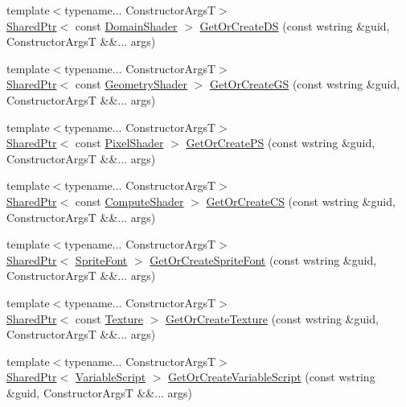 \begin{DoxyCompactItemize}
\item 
{\footnotesize template$<$typename... Constructor\+ArgsT$>$ }\\\hyperlink{namespacemage_a1e01ae66713838a7a67d30e44c67703e}{Shared\+Ptr}$<$ const \hyperlink{namespacemage_aef8cda73e2387cb89baa6c54a7fea542}{Domain\+Shader} $>$ \hyperlink{classmage_1_1_resource_manager_a77fd5f64a5191df468ccfaabd197d60b}{Get\+Or\+Create\+DS} (const wstring \&guid, Constructor\+ArgsT \&\&... args)
\item 
{\footnotesize template$<$typename... Constructor\+ArgsT$>$ }\\\hyperlink{namespacemage_a1e01ae66713838a7a67d30e44c67703e}{Shared\+Ptr}$<$ const \hyperlink{namespacemage_a0cf0bb4b74903e78658c96412d5687a6}{Geometry\+Shader} $>$ \hyperlink{classmage_1_1_resource_manager_a2d0c96862f5658379bc1bce9b77d9003}{Get\+Or\+Create\+GS} (const wstring \&guid, Constructor\+ArgsT \&\&... args)
\item 
{\footnotesize template$<$typename... Constructor\+ArgsT$>$ }\\\hyperlink{namespacemage_a1e01ae66713838a7a67d30e44c67703e}{Shared\+Ptr}$<$ const \hyperlink{namespacemage_a27ecaf266420ee7a494d64edc0757129}{Pixel\+Shader} $>$ \hyperlink{classmage_1_1_resource_manager_a567c4e158de9a664d76c464c12aed7d2}{Get\+Or\+Create\+PS} (const wstring \&guid, Constructor\+ArgsT \&\&... args)
\item 
{\footnotesize template$<$typename... Constructor\+ArgsT$>$ }\\\hyperlink{namespacemage_a1e01ae66713838a7a67d30e44c67703e}{Shared\+Ptr}$<$ const \hyperlink{namespacemage_ae040329401484b076f0cd1a7c43d19c9}{Compute\+Shader} $>$ \hyperlink{classmage_1_1_resource_manager_aa23f61f37b9d2fcc3f53d8018a32a22c}{Get\+Or\+Create\+CS} (const wstring \&guid, Constructor\+ArgsT \&\&... args)
\item 
{\footnotesize template$<$typename... Constructor\+ArgsT$>$ }\\\hyperlink{namespacemage_a1e01ae66713838a7a67d30e44c67703e}{Shared\+Ptr}$<$ \hyperlink{classmage_1_1_sprite_font}{Sprite\+Font} $>$ \hyperlink{classmage_1_1_resource_manager_a4460beca6c84b100f613936d26551119}{Get\+Or\+Create\+Sprite\+Font} (const wstring \&guid, Constructor\+ArgsT \&\&... args)
\item 
{\footnotesize template$<$typename... Constructor\+ArgsT$>$ }\\\hyperlink{namespacemage_a1e01ae66713838a7a67d30e44c67703e}{Shared\+Ptr}$<$ const \hyperlink{classmage_1_1_texture}{Texture} $>$ \hyperlink{classmage_1_1_resource_manager_a752a3c3db2cf7d93c61c5f22e0bf6a3a}{Get\+Or\+Create\+Texture} (const wstring \&guid, Constructor\+ArgsT \&\&... args)
\item 
{\footnotesize template$<$typename... Constructor\+ArgsT$>$ }\\\hyperlink{namespacemage_a1e01ae66713838a7a67d30e44c67703e}{Shared\+Ptr}$<$ \hyperlink{classmage_1_1_variable_script}{Variable\+Script} $>$ \hyperlink{classmage_1_1_resource_manager_aa3d2659c473c06423447114dcc0a602c}{Get\+Or\+Create\+Variable\+Script} (const wstring \&guid, Constructor\+ArgsT \&\&... args)
\end{DoxyCompactItemize}
